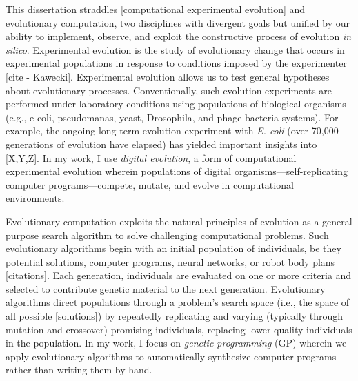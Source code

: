 

This dissertation straddles [computational experimental evolution] and evolutionary computation, two disciplines with divergent goals but unified by our ability to implement, observe, and exploit the constructive process of evolution \textit{in silico}.
Experimental evolution is the study of evolutionary change that occurs in experimental populations in response to conditions imposed by the experimenter [cite - Kawecki].
Experimental evolution allows us to test general hypotheses about evolutionary processes. 
Conventionally, such evolution experiments are performed under laboratory conditions using populations of biological organisms (e.g., e coli, pseudomanas, yeast, Drosophila, and phage-bacteria systems). 
For example, the ongoing long-term evolution experiment with \textit{E. coli} (over 70,000 generations of evolution have elapsed) has yielded important insights into [X,Y,Z].
In my work, I use \textit{digital evolution}, a form of computational experimental evolution wherein populations of digital organisms---self-replicating computer programs---compete, mutate, and evolve in computational environments. 

Evolutionary computation exploits the natural principles of evolution as a general purpose search algorithm to solve challenging computational problems.
Such evolutionary algorithms begin with an initial population of individuals, be they potential solutions, computer programs, neural networks, or robot body plans [citations]. 
Each generation, individuals are evaluated on one or more criteria and selected to contribute genetic material to the next generation.
Evolutionary algorithms direct populations through a problem's search space (i.e., the space of all possible [solutions]) by repeatedly replicating and varying (typically through mutation and crossover) promising individuals, replacing lower quality individuals in the population.
In my work, I focus on \textit{genetic programming} (GP) wherein we apply evolutionary algorithms to automatically synthesize computer programs rather than writing them by hand.

